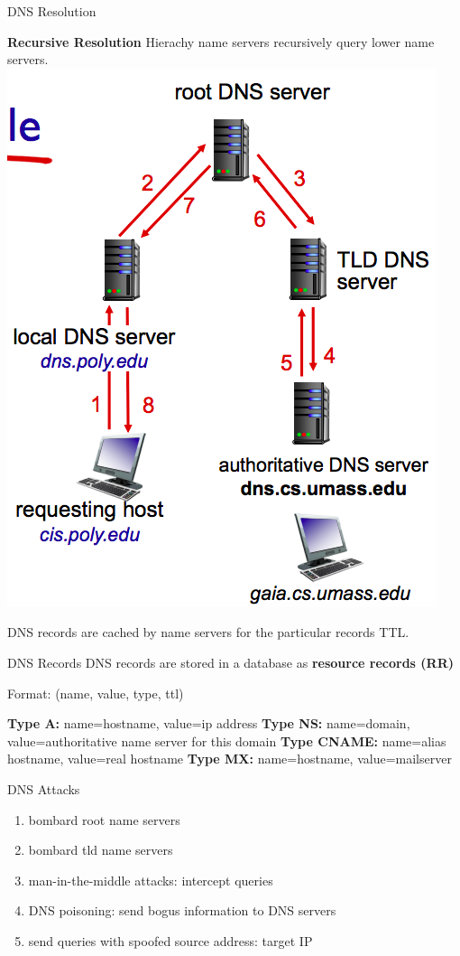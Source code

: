 \begin{topic}{DNS Resolution}
\begin{multicols}{2}
\textbf{Recursive Resolution}
Hierachy name servers recursively query lower name servers.
\includegraphics[scale=0.35]{coms3200/images/dnsresrec}
\end{multicols}

DNS records are cached by name servers for the particular records TTL.
\end{topic}

\begin{topic}{DNS Records}
DNS records are stored in a database as \textbf{resource records (RR)}

Format: (name, value, type, ttl)

\textbf{Type A:} name=hostname, value=ip address
\textbf{Type NS:} name=domain, value=authoritative name server for this domain
\textbf{Type CNAME:} name=alias hostname, value=real hostname
\textbf{Type MX:} name=hostname, value=mailserver
\end{topic}

\begin{topic}{DNS Attacks}
\begin{enumerate}
	\item bombard root name servers
	\item bombard tld name servers
	\item man-in-the-middle attacks: intercept queries
	\item DNS poisoning: send bogus information to DNS servers
	\item send queries with spoofed source address: target IP
\end{enumerate}
\end{topic}
